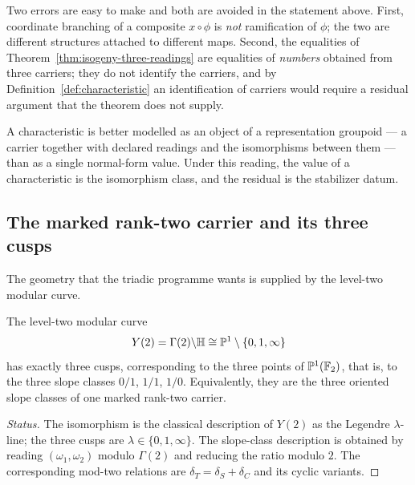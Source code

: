 \begin{warning}\label{warn:isogeny-traps}
Two errors are easy to make and both are avoided in the statement above.
First, coordinate branching of a composite $x\circ\phi$ is \emph{not} ramification of
$\phi$; the two are different structures attached to different maps.
Second, the equalities of Theorem~\ref{thm:isogeny-three-readings} are equalities of
\emph{numbers} obtained from three carriers; they do not identify the carriers, and by
Definition~\ref{def:characteristic} an identification of carriers would require a
residual argument that the theorem does not supply.
\end{warning}

\begin{proposal}\label{prop:characteristic-groupoid}
A characteristic is better modelled as an object of a representation groupoid --- a
carrier together with declared readings and the isomorphisms between them --- than as a
single normal-form value.  Under this reading, the value of a characteristic is the
isomorphism class, and the residual is the stabilizer datum.
\end{proposal}

\subsection{The marked rank-two carrier and its three cusps}

The geometry that the triadic programme wants is supplied by the level-two modular
curve.

\begin{proposition}\label{prop:three-cusps}
The level-two modular curve
\[
  Y(2)=\Gamma(2)\backslash\mathbb{H}\cong\mathbb{P}^{1}\setminus\{0,1,\infty\}
\]
has exactly three cusps, corresponding to the three points of $\mathbb{P}^{1}(\mathbb{F}_2)$, that is,
to the three slope classes $0/1$, $1/1$, $1/0$.  Equivalently, they are the three
oriented slope classes of one marked rank-two carrier.
\end{proposition}

\begin{proof}[Status]
The isomorphism is the classical description of $Y(2)$ as the Legendre $\lambda$-line;
the three cusps are $\lambda\in\{0,1,\infty\}$.  The slope-class description is obtained
by reading $(\omega_1,\omega_2)$ modulo $\Gamma(2)$ and reducing the ratio modulo $2$.
The corresponding mod-two relations are
$\delta_T=\delta_S+\delta_C$ and its cyclic variants.
\end{proof}

